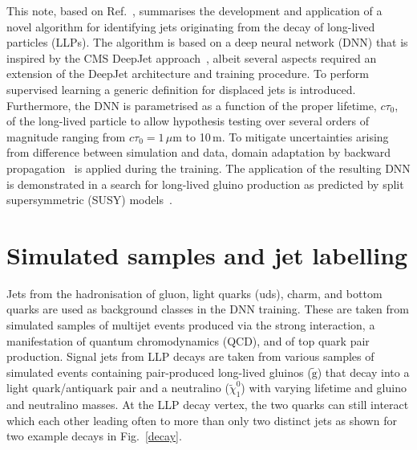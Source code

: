 \documentclass{webofc}
\newcommand{\tauo}{\ensuremath{c\tau_{0}}\xspace}
\newcommand{\ctau}{\ensuremath{c\tau_{0}}\xspace}
\newcommand{\gluino}{\ensuremath{\tilde{\textrm{g}}}\xspace}
\newcommand{\lsp}{\ensuremath{\tilde{\chi}_{1}^{0}}\xspace}
\begin{document}
This note, based on Ref.~\cite{CMS-EXO-19-011}, summarises the development and application of a novel algorithm for identifying jets originating from the decay of long-lived particles (LLPs). The algorithm is based on a deep neural network (DNN) that is inspired by the CMS DeepJet approach~\cite{dj}, albeit several aspects required an extension of the DeepJet architecture and training procedure. To perform supervised learning a generic definition for displaced jets is introduced. Furthermore, the DNN is parametrised as a function of the proper lifetime, \tauo, of the long-lived particle to allow hypothesis testing over several orders of magnitude ranging from $\ctau = 1\,\mu\textrm{m}$ to 10\,m. To mitigate uncertainties arising from difference between simulation and data, domain adaptation by backward propagation~\cite{da} is applied during the training. The application of the resulting DNN is demonstrated in a search for long-lived gluino production as predicted by split supersymmetric (SUSY) models~\cite{splitsusy}.

\section{Simulated samples and jet labelling}
\label{samples}

Jets from the hadronisation of gluon, light quarks (uds), charm, and bottom quarks are used as background classes in the DNN training. These are taken from simulated samples of multijet events produced via the strong interaction, a manifestation of quantum chromodynamics (QCD), and of top quark pair production. Signal jets from LLP decays are taken from various samples of simulated events containing pair-produced long-lived gluinos (\gluino) that decay into a light quark/antiquark pair and a neutralino (\lsp) with varying lifetime and gluino and neutralino masses. At the LLP decay vertex, the two quarks can still interact which each other leading often to more than only two distinct jets as shown for two example decays in Fig.~\ref{decay}.
\end{document}
